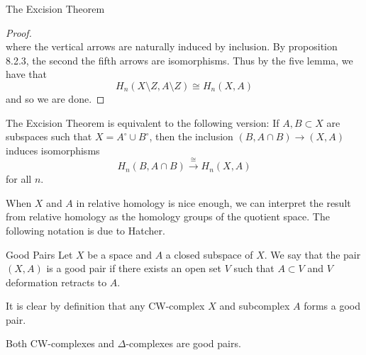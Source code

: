 \documentclass[a4paper]{article}
\begin{document}
\begin{thm}{The Excision Theorem}{}
\begin{proof}
{}\\
where the vertical arrows are naturally induced by inclusion. By proposition 8.2.3, the second the fifth arrows are isomorphisms. Thus by the five lemma, we have that $$H_n(X\setminus Z,A\setminus Z)\cong H_n(X,A)$$ and so we are done. 
\end{proof}
\end{thm}

\begin{lmm}{}{} The Excision Theorem is equivalent to the following version: If $A,B\subset X$ are subspaces such that $X=A^\circ\cup B^\circ$, then the inclusion $(B,A\cap B)\to (X,A)$ induces isomorphisms $$H_n(B,A\cap B)\overset{\cong}{\longrightarrow} H_n(X,A)$$ for all $n$. 
\end{lmm}

When $X$ and $A$ in relative homology is nice enough, we can interpret the result from relative homology as the homology groups of the quotient space. The following notation is due to Hatcher. 

\begin{defn}{Good Pairs}{} Let $X$ be a space and $A$ a closed subspace of $X$. We say that the pair $(X,A)$ is a good pair if there exists an open set $V$ such that $A\subset V$ and $V$ deformation retracts to $A$. 
\end{defn}

It is clear by definition that any CW-complex $X$ and subcomplex $A$ forms a good pair. 

\begin{lmm}{}{} Both CW-complexes and $\Delta$-complexes are good pairs. 
\end{lmm}
\end{document}
